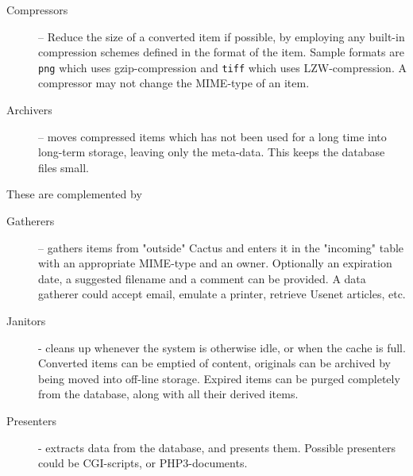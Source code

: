 \begin{description}
\item[Compressors] -- Reduce the size of a converted item if
  possible, by employing any built-in compression schemes
  defined in the format of the item.  Sample formats are
  \texttt{png} which uses gzip-compression and \texttt{tiff}
  which uses LZW-compression.  A compressor may not change
  the MIME-type of an item.



\item[Archivers] -- moves compressed items which has not
  been used for a long time into long-term storage, leaving
  only the meta-data.  This keeps the database files small.



\end{description}

These are complemented by

\begin{description}
\item[Gatherers] -- gathers items from "outside" Cactus and
  enters it in the "incoming" table with an appropriate
  MIME-type and an owner.  Optionally an expiration date, a
  suggested filename and a comment can be provided. A
  data gatherer could accept email, emulate a printer, retrieve
  Usenet articles, etc.

\item[Janitors] - cleans up whenever the system is otherwise
  idle, or when the cache is full.  Converted items can be
  emptied of content, originals can be archived by being
  moved into off-line storage.  Expired items can be purged
  completely from the database, along with all their derived
  items.

\item[Presenters] - extracts data from the database, and
  presents them.  Possible presenters could be CGI-scripts,
  or  PHP3-documents.

\end{description}

